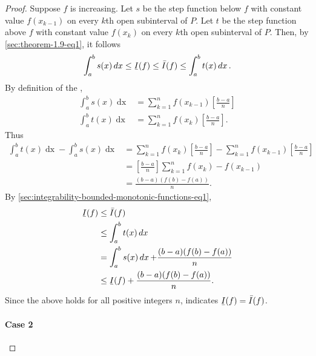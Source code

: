 \documentclass{report}
\newcommand{\ubar}[1]{\text{\b{$#1$}}}
\begin{document}
\begin{proof}
    Suppose $f$ is increasing.
    Let $s$ be the step function below $f$ with constant value $f(x_{k-1})$
      on every $k$th open subinterval of $P$.
    Let $t$ be the step function above $f$ with constant value $f(x_k)$
      on every $k$th open subinterval of $P$.
    Then, by \eqref{sec:theorem-1.9-eq1}, it follows
      \begin{equation}
        \label{sec:integrability-bounded-monotonic-functions-eq1}
        \int_a^b s(x) \mathop{dx} \leq \ubar{I}(f)
          \leq \bar{I}(f) \leq \int_a^b t(x) \mathop{dx}.
      \end{equation}
    By definition of the ,
      \begin{align*}
        \int_a^b s(x) \mathop{dx}
          & = \sum_{k=1}^n f(x_{k-1})\left[\frac{b - a}{n}\right] \\
        \int_a^b t(x) \mathop{dx}
          & = \sum_{k=1}^n f(x_k)\left[\frac{b - a}{n}\right].
      \end{align*}
    Thus
      \begin{align*}
        \int_a^b t(x) \mathop{dx} - \int_a^b s(x) \mathop{dx}
          & = \sum_{k=1}^n f(x_k)\left[\frac{b - a}{n}\right] -
              \sum_{k=1}^n f(x_{k-1})\left[\frac{b - a}{n}\right] \\
          & = \left[\frac{b - a}{n}\right] \sum_{k=1}^n f(x_k) - f(x_{k-1}) \\
          & = \frac{(b - a)(f(b) - f(a))}{n}.
      \end{align*}
    By \eqref{sec:integrability-bounded-monotonic-functions-eq1},
      \begin{align*}
        \ubar{I}(f)
          & \leq \bar{I}(f) \\
          & \leq \int_a^b t(x) \mathop{dx} \\
          & = \int_a^b s(x) \mathop{dx} + \frac{(b - a)(f(b) - f(a))}{n} \\
          & \leq \ubar{I}(f) + \frac{(b - a)(f(b) - f(a))}{n}.
      \end{align*}
    Since the above holds for all positive integers $n$,
       indicates $\ubar{I}(f) = \bar{I}(f)$.

  \paragraph{Case 2}%


\end{proof}
\end{document}
